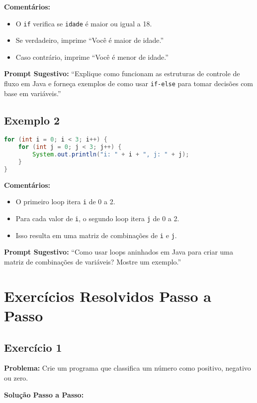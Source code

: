 \documentclass[a4paper,12pt]{book}
\begin{document}
\textbf{Comentários:}
\begin{itemize}
    \item O \texttt{if} verifica se \texttt{idade} é maior ou igual a 18.
    \item Se verdadeiro, imprime ``Você é maior de idade.''
    \item Caso contrário, imprime ``Você é menor de idade.''
\end{itemize}

\textbf{Prompt Sugestivo:} ``Explique como funcionam as estruturas de controle de fluxo em Java e forneça exemplos de como usar \texttt{if-else} para tomar decisões com base em variáveis.''

\subsection{Exemplo 2}

\begin{lstlisting}[language=Java]
for (int i = 0; i < 3; i++) {
    for (int j = 0; j < 3; j++) {
        System.out.println("i: " + i + ", j: " + j);
    }
}
\end{lstlisting}

\textbf{Comentários:}
\begin{itemize}
    \item O primeiro loop itera \texttt{i} de 0 a 2.
    \item Para cada valor de \texttt{i}, o segundo loop itera \texttt{j} de 0 a 2.
    \item Isso resulta em uma matriz de combinações de \texttt{i} e \texttt{j}.
\end{itemize}

\textbf{Prompt Sugestivo:} ``Como usar loops aninhados em Java para criar uma matriz de combinações de variáveis? Mostre um exemplo.''

\section{Exercícios Resolvidos Passo a Passo}

\subsection{Exercício 1}

\textbf{Problema:} Crie um programa que classifica um número como positivo, negativo ou zero.

\textbf{Solução Passo a Passo:}
\end{document}
